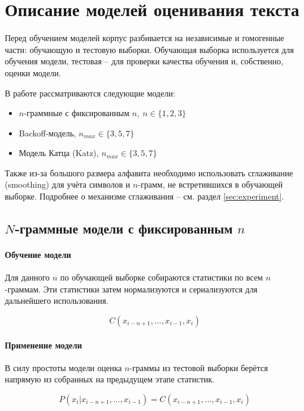 \section{ Описание моделей оценивания текста }\label{sec:models}

Перед обучением моделей корпус разбивается на независимые и гомогенные части: обучающую и тестовую выборки. Обучающая выборка используется для обучения модели, тестовая -- для проверки качества обучения и, собственно, оценки модели.

В работе рассматриваются следующие модели: 

\begin{itemize}
	\item $n$-граммные с фиксированным $n,\ n \in \{1,2,3\}$
	
	\item Backoff-модель, $n_{max} \in \{ 3, 5, 7 \}$
	
	\item Модель Катца (Katz),  $n_{max} \in \{ 3, 5, 7 \}$
\end{itemize}

Также из-за большого размера алфавита необходимо использовать сглаживание (smoothing) для учёта символов и $n$-грамм, не встретившихся в обучающей выборке. Подробнее о механизме сглаживания -- см. раздел \ref{sec:experiment}.

\subsection{ $N$-граммные модели с фиксированным $n$ }

\paragraph{ Обучение модели } Для данного $n$ по обучающей выборке собираются статистики по всем $n$-граммам. Эти статистики затем нормализуются и сериализуются для дальнейшего использования.

$$ C(x_{i - n + 1}, ..., x_{i - 1}, x_i) $$ 

\paragraph{ Применение модели } В силу простоты модели оценка $n$-граммы из тестовой выборки берётся напрямую из собранных на предыдущем этапе статистик.

$$ P(x_i | x_{i - n + 1}, ..., x_{i - 1}) = C(x_{i - n + 1}, ..., x_{i - 1}, x_i) $$

